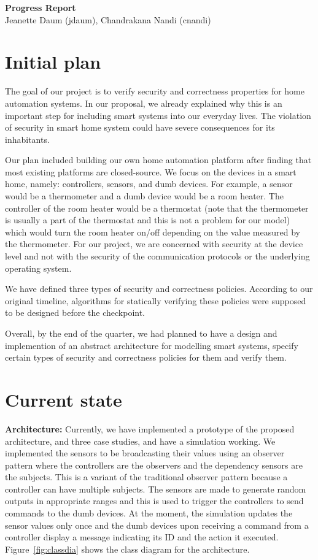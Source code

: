 \documentclass{article}
\begin{document}
\begin{center}
\large \textbf{Progress Report}\\
\normalsize {Jeanette Daum (jdaum), Chandrakana Nandi (cnandi) }
\end{center}
\section{Initial plan}
The goal of our project is to verify security and correctness properties for home automation systems. In our proposal, we already explained why this is an important step for including smart systems into our everyday lives. The violation of security in smart home system could have severe consequences for its inhabitants. 

Our plan included building our own home automation platform after finding that most existing platforms are closed-source. We focus on the devices in a smart home, namely: controllers, sensors, and dumb devices. For example, a sensor would be a thermometer and a dumb device would be a room heater. The controller of the room heater would be a thermostat (note that the thermometer is usually a part of the thermostat and this is not a problem for our model) which would turn the room heater on/off depending on the value measured by the thermometer. For our project, we are concerned with security at the device level and not with the security of the communication protocols or the underlying operating system. 

We have defined three types of security and correctness policies. According to our original timeline, algorithms for statically verifying these policies were supposed to be designed before the checkpoint.

Overall, by the end of the quarter, we had planned to have a design and implemention of an abstract architecture for modelling smart systems, specify certain types of security and correctness policies for them and verify them. 

\section{Current state}
\textbf{Architecture:} Currently, we have implemented a prototype of the proposed architecture, and three case studies, and have a simulation working. We implemented the sensors to be broadcasting their values using an observer pattern where the controllers are the observers and the dependency sensors are the subjects. This is a variant of the traditional observer pattern because a controller can have multiple subjects. The sensors are made to generate random outputs in appropriate ranges and this is used to trigger the controllers to send commands to the dumb devices.  At the moment, the simulation updates the sensor values only once and the dumb devices upon receiving a command from a controller display a message indicating its ID and the action it executed. Figure~\ref{fig:classdia} shows the class diagram for the architecture. 
\end{document}
